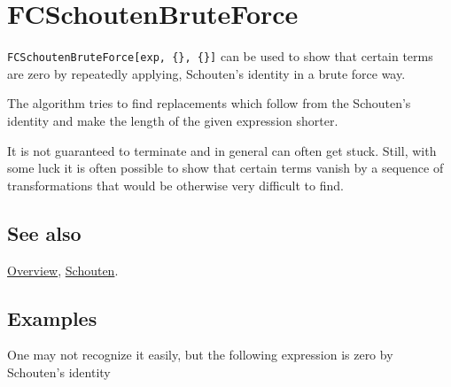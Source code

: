 \documentclass[../FeynCalcManual.tex]{subfiles}
\begin{document}
\hypertarget{fcschoutenbruteforce}{%
\section{FCSchoutenBruteForce}\label{fcschoutenbruteforce}}

\texttt{FCSchoutenBruteForce[\allowbreak{}exp,\ \allowbreak{}\{\allowbreak{}\},\ \allowbreak{}\{\allowbreak{}\}]}
can be used to show that certain terms are zero by repeatedly applying,
Schouten's identity in a brute force way.

The algorithm tries to find replacements which follow from the
Schouten's identity and make the length of the given expression shorter.

It is not guaranteed to terminate and in general can often get stuck.
Still, with some luck it is often possible to show that certain terms
vanish by a sequence of transformations that would be otherwise very
difficult to find.

\subsection{See also}

\hyperlink{toc}{Overview}, \hyperlink{schouten}{Schouten}.

\subsection{Examples}

One may not recognize it easily, but the following expression is zero by
Schouten's identity

\begin{Shaded}
\begin{Highlighting}[]
\OperatorTok{[]} 
 
 \ExtensionTok{=}\OperatorTok{[][}\OperatorTok{,}\OperatorTok{,}\OperatorTok{,}\OperatorTok{]}\OperatorTok{[}\OperatorTok{,}\OperatorTok{]} \SpecialCharTok{+}\OperatorTok{[][}\OperatorTok{,}\OperatorTok{,}\OperatorTok{,}\OperatorTok{]}\OperatorTok{[}\OperatorTok{,}\OperatorTok{]} \SpecialCharTok{+} 
\OperatorTok{[][}\OperatorTok{,}\OperatorTok{,}\OperatorTok{,}\OperatorTok{]}\OperatorTok{[}\OperatorTok{,}\OperatorTok{]} \SpecialCharTok{+}\OperatorTok{[][}\OperatorTok{,}\OperatorTok{,}\OperatorTok{,}\OperatorTok{]}\OperatorTok{[}\OperatorTok{,}\OperatorTok{]} \SpecialCharTok{{-}}
\OperatorTok{[][}\OperatorTok{,}\OperatorTok{,}\OperatorTok{,}\OperatorTok{]}\OperatorTok{[}\OperatorTok{,}\OperatorTok{]}
\end{Highlighting}
\end{Shaded}
\end{document}
